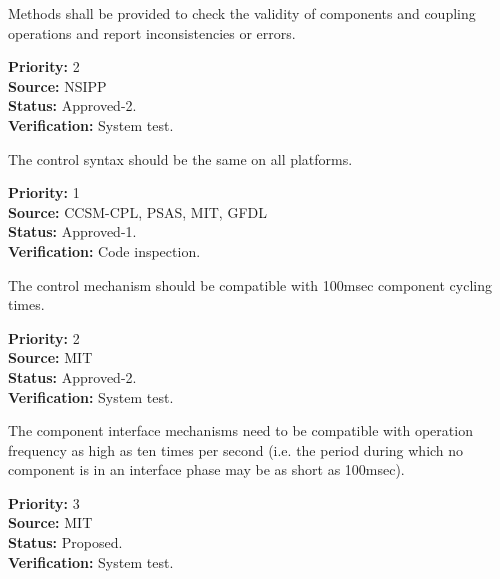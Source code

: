 
Methods shall be provided to check the validity of components and 
coupling operations and report inconsistencies or errors.
\begin{reqlist}
{\bf Priority:} 2\\ 
{\bf Source:} NSIPP \\
{\bf Status:} Approved-2.\\
{\bf Verification:} System test.
\end{reqlist}

The control syntax should be the same on all platforms.
\begin{reqlist}
{\bf Priority:} 1\\
{\bf Source:}  CCSM-CPL, PSAS, MIT, GFDL \\
{\bf Status:} Approved-1. \\
{\bf Verification:} Code inspection.
\end{reqlist}

The control mechanism should be compatible with 100msec 
component cycling times.
\begin{reqlist}
{\bf Priority:} 2\\
{\bf Source:}  MIT \\
{\bf Status:} Approved-2. \\
{\bf Verification:} System test.
\end{reqlist}

The component interface mechanisms need to be compatible with
operation frequency as high as ten times per second (i.e. the period
during which no component is in an interface phase may be
as short as 100msec). 
\begin{reqlist}
{\bf Priority:} 3 \\ 
{\bf Source:} MIT \\
{\bf Status:} Proposed.\\
{\bf Verification:} System test.
\end{reqlist}









